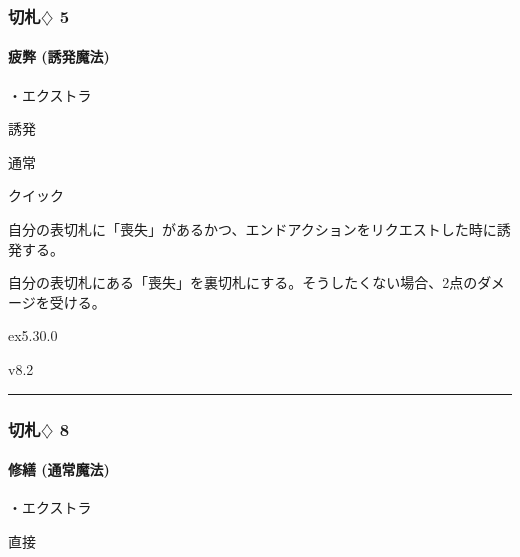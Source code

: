 \documentclass[letterpaper,10pt,dvipdfmx]{sphinxmanual}
\begin{document}
\subsubsection{切札{\normalsize $\diamondsuit$} 5}
\label{\detokenize{auto/frameActionlist:id60}}

\paragraph{疲弊 (誘発魔法)}
\label{\detokenize{auto/frameActionlist:act-exhaust}}\label{\detokenize{auto/frameActionlist:id61}}
\sphinxAtStartPar
{}

\sphinxAtStartPar
・エクストラ

\sphinxAtStartPar
{} 誘発

\sphinxAtStartPar
{} 通常

\sphinxAtStartPar
{} クイック

\sphinxAtStartPar
{}

\sphinxAtStartPar
自分の表切札に「喪失」があるかつ、エンドアクションをリクエストした時に誘発する。

\sphinxAtStartPar
{}

\sphinxAtStartPar
自分の表切札にある「喪失」を裏切札にする。そうしたくない場合、2点のダメージを受ける。

\sphinxAtStartPar
{}  ex5.30.0

\sphinxAtStartPar
{}  v8.2


\bigskip\hrule\bigskip



\subsubsection{切札{\normalsize $\diamondsuit$} 8}
\label{\detokenize{auto/frameActionlist:id62}}

\paragraph{修繕 (通常魔法)}
\label{\detokenize{auto/frameActionlist:act-repair}}\label{\detokenize{auto/frameActionlist:id63}}
\sphinxAtStartPar
{}

\sphinxAtStartPar
・エクストラ

\sphinxAtStartPar
{} 直接
\end{document}
